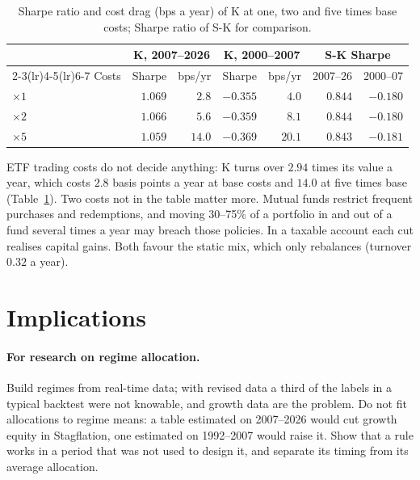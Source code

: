 \documentclass[11pt,a4paper]{article}
\begin{document}
\begin{table}[htbp]
\centering
\caption{Sharpe ratio and cost drag (bps a year) of K at one, two and five times base costs; Sharpe ratio of S-K
for comparison.}
\label{tab:cost}
\small
\begin{tabular}{@{}lrrrrrr@{}}
\toprule
& \multicolumn{2}{c}{K, 2007--2026} & \multicolumn{2}{c}{K, 2000--2007} & \multicolumn{2}{c}{S-K Sharpe} \\
\cmidrule(lr){2-3}\cmidrule(lr){4-5}\cmidrule(lr){6-7}
Costs & Sharpe & bps/yr & Sharpe & bps/yr & 2007--26 & 2000--07 \\
\midrule
$\times1$ & $1.069$ & $2.8$ & $-0.355$ & $4.0$ & $0.844$ & $-0.180$ \\
$\times2$ & $1.066$ & $5.6$ & $-0.359$ & $8.1$ & $0.844$ & $-0.180$ \\
$\times5$ & $1.059$ & $14.0$ & $-0.369$ & $20.1$ & $0.843$ & $-0.181$ \\
\bottomrule
\end{tabular}
\end{table}

ETF trading costs do not decide anything: K turns over $2.94$ times its value a year, which costs $2.8$
basis points a year at base costs and $14.0$ at five times base (Table~\ref{tab:cost}). Two costs not in
the table matter more. Mutual funds restrict frequent purchases and redemptions, and moving 30--75\% of a
portfolio in and out of a fund several times a year may breach those policies. In a taxable account each cut
realises capital gains. Both favour the static mix, which only rebalances (turnover $0.32$ a year).

\section{Implications}

\paragraph{For research on regime allocation.} Build regimes from real-time data; with revised data a third of
the labels in a typical backtest were not knowable, and growth data are the problem. Do not fit allocations to
regime means: a table estimated on 2007--2026 would cut growth equity in Stagflation, one estimated on 1992--2007
would raise it. Show that a rule works in a period that was not used to design it, and separate its timing from
its average allocation.
\end{document}
